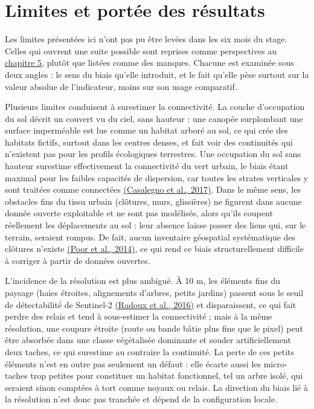 \documentclass[a4paper,11pt]{report}
\begin{document}
\section{Limites et portée des résultats}\label{sec:4.6}

Les limites présentées ici n'ont pas pu être levées dans les six mois du stage. Celles qui ouvrent une suite possible sont reprises comme perspectives au \hyperref[chap:5]{chapitre 5}, plutôt que listées comme des manques. Chacune est examinée sous deux angles : le sens du biais qu'elle introduit, et le fait qu'elle pèse surtout sur la valeur absolue de l'indicateur, moins sur son usage comparatif.

Plusieurs limites conduisent à surestimer la connectivité. La couche d'occupation du sol décrit un couvert vu du ciel, sans hauteur : une canopée surplombant une surface imperméable est lue comme un habitat arboré au sol, ce qui crée des habitats fictifs, surtout dans les centres denses, et fait voir des continuités qui n'existent pas pour les profils écologiques terrestres. Une occupation du sol sans hauteur surestime effectivement la connectivité du vert urbain, le biais étant maximal pour les faibles capacités de dispersion, car toutes les strates verticales y sont traitées comme connectées \hyperref[sec:bibliographie]{(Casalegno et al., 2017)}. Dans le même sens, les obstacles fins du tissu urbain (clôtures, murs, glissières) ne figurent dans aucune donnée ouverte exploitable et ne sont pas modélisés, alors qu'ils coupent réellement les déplacements au sol : leur absence laisse passer des liens qui, sur le terrain, seraient rompus. De fait, aucun inventaire géospatial systématique des clôtures n'existe \hyperref[sec:bibliographie]{(Poor et al., 2014)}, ce qui rend ce biais structurellement difficile à corriger à partir de données ouvertes.

L'incidence de la résolution est plus ambiguë. À 10 m, les éléments fins du paysage (haies étroites, alignements d'arbres, petits jardins) passent sous le seuil de détectabilité de Sentinel-2 \hyperref[sec:bibliographie]{(Radoux et al., 2016)} et disparaissent, ce qui fait perdre des relais et tend à sous-estimer la connectivité ; mais à la même résolution, une coupure étroite (route ou bande bâtie plus fine que le pixel) peut être absorbée dans une classe végétalisée dominante et souder artificiellement deux taches, ce qui surestime au contraire la continuité. La perte de ces petits éléments n'est en outre pas seulement un défaut : elle écarte aussi les micro-taches trop petites pour constituer un habitat fonctionnel, tel un arbre isolé, qui seraient sinon comptées à tort comme noyaux ou relais. La direction du biais lié à la résolution n'est donc pas tranchée et dépend de la configuration locale.
\end{document}
